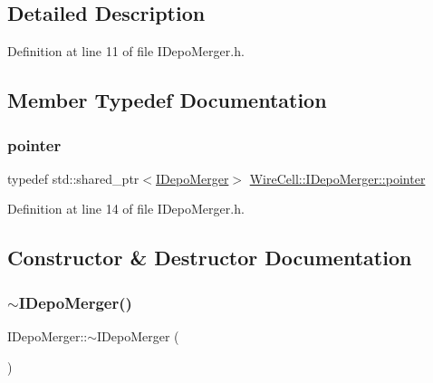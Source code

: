 \subsection{Detailed Description}


Definition at line 11 of file I\+Depo\+Merger.\+h.



\subsection{Member Typedef Documentation}
\mbox{\label{class_wire_cell_1_1_i_depo_merger_a7d2c27e09807420de446264e3e595b06}} 
\subsubsection{\texorpdfstring{pointer}{pointer}}
{\footnotesize\ttfamily typedef std\+::shared\+\_\+ptr$<$\hyperlink{class_wire_cell_1_1_i_depo_merger}{I\+Depo\+Merger}$>$ \hyperlink{class_wire_cell_1_1_i_depo_merger_a7d2c27e09807420de446264e3e595b06}{Wire\+Cell\+::\+I\+Depo\+Merger\+::pointer}}



Definition at line 14 of file I\+Depo\+Merger.\+h.



\subsection{Constructor \& Destructor Documentation}
\mbox{\label{class_wire_cell_1_1_i_depo_merger_a91f686433e29d6b681943941ab2ce0d5}} 
\subsubsection{\texorpdfstring{$\sim$\+I\+Depo\+Merger()}{~IDepoMerger()}}
{\footnotesize\ttfamily I\+Depo\+Merger\+::$\sim$\+I\+Depo\+Merger (\begin{DoxyParamCaption}{ }\end{DoxyParamCaption})\hspace{0.3cm}{\ttfamily [virtual]}}




